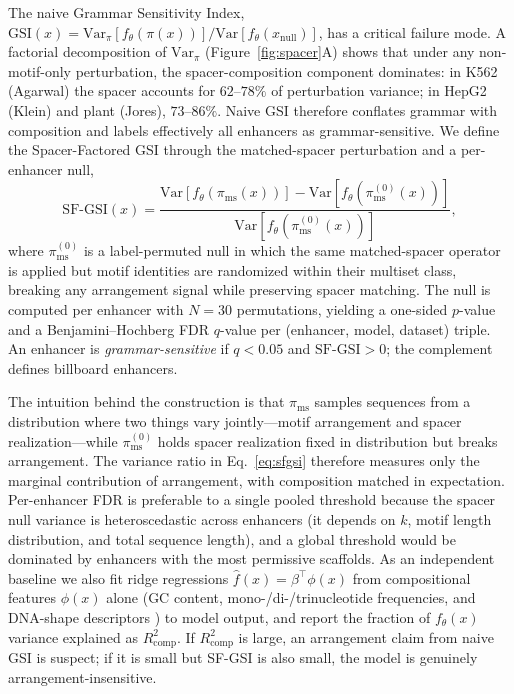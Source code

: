 \documentclass{article}
\begin{document}
The naive Grammar Sensitivity Index, $\mathrm{GSI}(x) = \mathrm{Var}_{\pi}[f_\theta(\pi(x))] / \mathrm{Var}[f_\theta(x_{\mathrm{null}})]$, has a critical failure mode. A factorial decomposition of $\mathrm{Var}_\pi$ (Figure~\ref{fig:spacer}A) shows that under any non-motif-only perturbation, the spacer-composition component dominates: in K562 (Agarwal) the spacer accounts for $62$--$78\%$ of perturbation variance; in HepG2 (Klein) and plant (Jores), $73$--$86\%$. Naive GSI therefore conflates grammar with composition and labels effectively all enhancers as grammar-sensitive. We define the Spacer-Factored GSI through the matched-spacer perturbation and a per-enhancer null,
\begin{equation}
  \mathrm{SF\text{-}GSI}(x) =
  \frac{\mathrm{Var}\!\left[f_\theta(\pi_{\mathrm{ms}}(x))\right] - \mathrm{Var}\!\left[f_\theta(\pi_{\mathrm{ms}}^{(0)}(x))\right]}{\mathrm{Var}\!\left[f_\theta(\pi_{\mathrm{ms}}^{(0)}(x))\right]},
  \label{eq:sfgsi}
\end{equation}
where $\pi_{\mathrm{ms}}^{(0)}$ is a label-permuted null in which the same matched-spacer operator is applied but motif identities are randomized within their multiset class, breaking any arrangement signal while preserving spacer matching. The null is computed per enhancer with $N=30$ permutations, yielding a one-sided $p$-value and a Benjamini--Hochberg FDR $q$-value per (enhancer, model, dataset) triple. An enhancer is \emph{grammar-sensitive} if $q < 0.05$ and $\mathrm{SF\text{-}GSI} > 0$; the complement defines billboard enhancers.

The intuition behind the construction is that $\pi_{\mathrm{ms}}$ samples sequences from a distribution where two things vary jointly---motif arrangement and spacer realization---while $\pi_{\mathrm{ms}}^{(0)}$ holds spacer realization fixed in distribution but breaks arrangement. The variance ratio in Eq.~\ref{eq:sfgsi} therefore measures only the marginal contribution of arrangement, with composition matched in expectation. Per-enhancer FDR is preferable to a single pooled threshold because the spacer null variance is heteroscedastic across enhancers (it depends on $k$, motif length distribution, and total sequence length), and a global threshold would be dominated by enhancers with the most permissive scaffolds. As an independent baseline we also fit ridge regressions $\hat f(x) = \beta^\top \phi(x)$ from compositional features $\phi(x)$ alone (GC content, mono-/di-/trinucleotide frequencies, and DNA-shape descriptors \citep{zhou2013dnashape}) to model output, and report the fraction of $f_\theta(x)$ variance explained as $R^2_{\mathrm{comp}}$. If $R^2_{\mathrm{comp}}$ is large, an arrangement claim from naive GSI is suspect; if it is small but SF-GSI is also small, the model is genuinely arrangement-insensitive.
\end{document}
